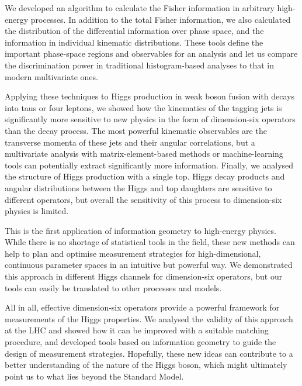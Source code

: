 We developed an algorithm to calculate the Fisher information in
arbitrary high-energy processes. In addition to the total Fisher
information, we also calculated the distribution of the differential
information over phase space, and the information in individual
kinematic distributions. These tools define the important phase-space
regions and observables for an analysis and let us compare the
discrimination power in traditional histogram-based analyses to that
in modern multivariate ones.

Applying these techniques to Higgs production in weak boson fusion
with decays into taus or four leptons, we showed how the kinematics of
the tagging jets is significantly more sensitive to new physics in the
form of dimension-six operators than the decay process. The most
powerful kinematic observables are the transverse momenta of these
jets and their angular correlations, but a multivariate analysis with
matrix-element-based methods or machine-learning tools can potentially
extract significantly more information. Finally, we analysed the
structure of Higgs production with a single top. Higgs decay products
and angular distributions between the Higgs and top daughters are
sensitive to different operators, but overall the sensitivity of this
process to dimension-six physics is limited.

This is the first application of information geometry to high-energy
physics. While there is no shortage of statistical tools in the field,
these new methods can help to plan and optimise measurement strategies
for high-dimensional, continuous parameter spaces in an intuitive but
powerful way. We demonstrated this approach in different Higgs
channels for dimension-six operators, but our tools can easily be
translated to other processes and models.

\newparagraph
%
All in all, effective dimension-six operators provide a powerful
framework for measurements of the Higgs properties. We analysed the
validity of this approach at the LHC and showed how it can be improved
with a suitable matching procedure, and developed tools based on
information geometry to guide the design of measurement
strategies. Hopefully, these new ideas can contribute to a better
understanding of the nature of the Higgs boson, which might ultimately
point us to what lies beyond the Standard Model.
